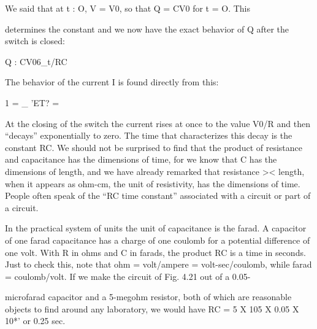 We said that at t : O, V = V0, so that Q = CV0 for t = O. This

determines the constant and we now have the exact behavior of Q
after the switch is closed:

Q : CV06_t/RC 
\begin{equation}
\end{equation}

The behavior of the current I is found directly from this:

1 = _ 'ET? = %
\begin{equation}
\end{equation}

At the closing of the switch the current rises at once to the value
V0/R and then ``decays'' exponentially to zero. The time that characterizes
this decay is the constant RC. We should not be surprised to
find that the product of resistance and capacitance has the dimensions
of time, for we know that C has the dimensions of length, and
we have already remarked that resistance >< length, when it appears
as ohm-cm, the unit of resistivity, has the dimensions of time. People
often speak of the ``RC time constant'' associated with a circuit or
part of a circuit.

In the practical system of units the unit of capacitance is the farad.
A capacitor of one farad capacitance has a charge of one coulomb
for a potential difference of one volt. With R in ohms and C in
farads, the product RC is a time in seconds. Just to check this,
note that ohm = volt/ampere = volt-sec/coulomb, while farad =
coulomb/volt. If we make the circuit of Fig. 4.21 out of a 0.05-

microfarad capacitor and a 5-megohm resistor, both of which are
reasonable objects to find around any laboratory, we would have
RC = 5 X 105 X 0.05 X 10*' or 0.25 sec.

